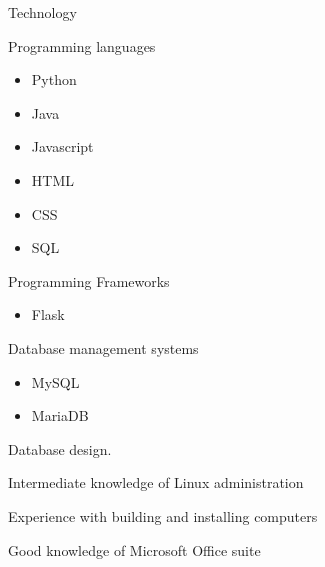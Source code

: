 


\begin{cventriesskill}


\cventryskill
{Technology} %
{ %
\begin{cvitems}
\item {Programming languages}
\begin{itemize}
	\item Python
	\item Java
	\item Javascript
	\item HTML
	\item CSS
	\item SQL
\end{itemize}
\item {Programming Frameworks}
\begin{itemize}
	\item Flask
\end{itemize}
\item {Database management systems}
\begin{itemize}
	\item MySQL
	\item MariaDB
\end{itemize}
\item {Database design.}
\item {Intermediate knowledge of Linux administration}
\item {Experience with building and installing computers}
\item {Good knowledge of Microsoft Office suite}
\end{cvitems}
}


\end{cventriesskill}